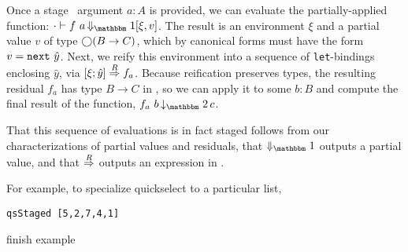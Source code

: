 Once a stage \bbone\ argument $a:A$ is provided, we can evaluate the partially-applied
function:
$\cdot\vdash f~a \mathop{\redonesym} [\xi,v]$.
The result is an environment $\xi$ and a partial value $v$ of type $\bigcirc(B\to
C)$, which by canonical forms must have the form $v = {\tt next}~\hat y$. 
Next, we reify this environment into a sequence of \verb|let|-bindings
enclosing $\hat y$, via $[{\xi};{\hat y}]\overset{R}\Rightarrow{f_a}$. 
Because reification preserves types, the resulting residual $f_a$ has type $B\to C$ in \langTwo, so we can apply it to some $b:B$
and compute the final result of the function, $f_a~b \mathop{\tworedsym} c$.

That this sequence of evaluations is in fact staged follows from our
characterizations of partial values and residuals, that $\redonesym$
outputs a partial value, and that $\overset{R}\Rightarrow$ outputs an expression in \langTwo.

For example, to specialize quickselect to a particular list, 
\begin{lstlisting}
qsStaged [5,2,7,4,1]
\end{lstlisting}
\TODO finish example


